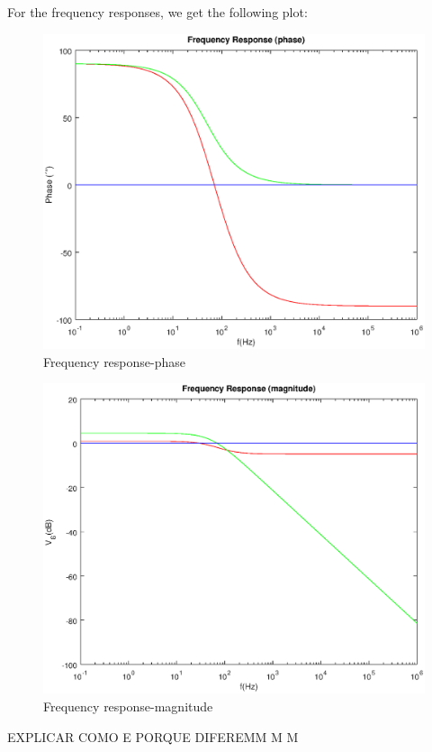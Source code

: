   For the frequency responses, we get the following plot:
    \begin{figure}[H] \centering
    \includegraphics[width=1\linewidth]{degree.eps}
    \caption{Frequency response-phase}
    \label{fig:frequencyresponsephase}
    \end{figure}
    
      \begin{figure}[H] \centering
    \includegraphics[width=1\linewidth]{dB.eps}
    \caption{Frequency response-magnitude}
    \label{fig:frequencyresponsemagnitude}
    \end{figure}
  
  
  EXPLICAR COMO E PORQUE DIFEREMM
  M
  M